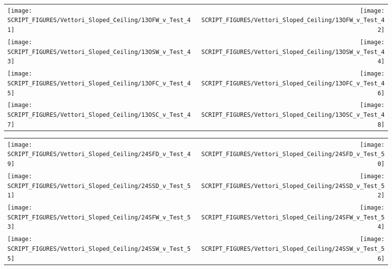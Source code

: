 \begin{figure}[p]
\begin{tabular*}{\textwidth}{l@{\extracolsep{\fill}}r}
\texttt{[image: SCRIPT\_FIGURES/Vettori\_Sloped\_Ceiling/13OFW\_v\_Test\_41]} &
\texttt{[image: SCRIPT\_FIGURES/Vettori\_Sloped\_Ceiling/13OFW\_v\_Test\_42]} \\
\texttt{[image: SCRIPT\_FIGURES/Vettori\_Sloped\_Ceiling/13OSW\_v\_Test\_43]} &
\texttt{[image: SCRIPT\_FIGURES/Vettori\_Sloped\_Ceiling/13OSW\_v\_Test\_44]} \\
\texttt{[image: SCRIPT\_FIGURES/Vettori\_Sloped\_Ceiling/13OFC\_v\_Test\_45]} &
\texttt{[image: SCRIPT\_FIGURES/Vettori\_Sloped\_Ceiling/13OFC\_v\_Test\_46]} \\
\texttt{[image: SCRIPT\_FIGURES/Vettori\_Sloped\_Ceiling/13OSC\_v\_Test\_47]} &
\texttt{[image: SCRIPT\_FIGURES/Vettori\_Sloped\_Ceiling/13OSC\_v\_Test\_48]} \\
\end{tabular*}
\label{Vettori_Sloped_6}
\end{figure}

\begin{figure}[p]
\begin{tabular*}{\textwidth}{l@{\extracolsep{\fill}}r}
\texttt{[image: SCRIPT\_FIGURES/Vettori\_Sloped\_Ceiling/24SFD\_v\_Test\_49]} &
\texttt{[image: SCRIPT\_FIGURES/Vettori\_Sloped\_Ceiling/24SFD\_v\_Test\_50]} \\
\texttt{[image: SCRIPT\_FIGURES/Vettori\_Sloped\_Ceiling/24SSD\_v\_Test\_51]} &
\texttt{[image: SCRIPT\_FIGURES/Vettori\_Sloped\_Ceiling/24SSD\_v\_Test\_52]} \\
\texttt{[image: SCRIPT\_FIGURES/Vettori\_Sloped\_Ceiling/24SFW\_v\_Test\_53]} &
\texttt{[image: SCRIPT\_FIGURES/Vettori\_Sloped\_Ceiling/24SFW\_v\_Test\_54]} \\
\texttt{[image: SCRIPT\_FIGURES/Vettori\_Sloped\_Ceiling/24SSW\_v\_Test\_55]} &
\texttt{[image: SCRIPT\_FIGURES/Vettori\_Sloped\_Ceiling/24SSW\_v\_Test\_56]} \\
\end{tabular*}
\label{Vettori_Sloped_7}
\end{figure}

